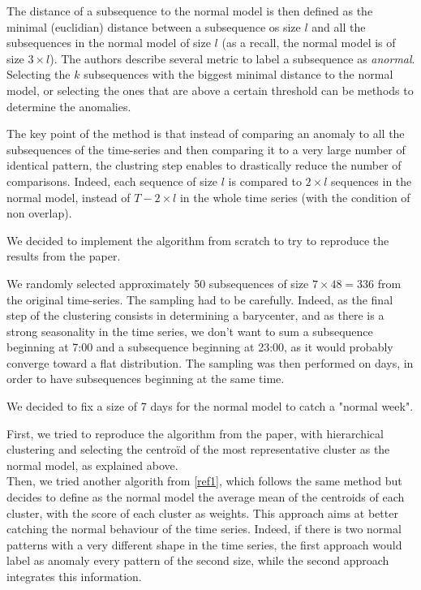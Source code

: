 \documentclass[11pt]{article}
\begin{document}
The distance of a subsequence to the normal model is then defined as the minimal (euclidian) distance between a subsequence os size $l$ and all the subsequences in the normal model of size $l$ (as a recall, the normal model is of size $3 \times l$).
The authors describe several metric to label a subsequence as \textit{anormal}. 
Selecting the $k$ subsequences with the biggest minimal distance to the normal model, or selecting the ones that are above a certain threshold can be methods to determine the anomalies.

The key point of the method is that instead of comparing an anomaly to all the subsequences of the time-series and then comparing it to a very large number of identical pattern, the clustring step enables to drastically reduce the number of comparisons. 
Indeed, each sequence of size $l$ is compared to $2 \times l $ sequences in the normal model, instead of $T - 2 \times l$ in the whole time series (with the condition of non overlap). 


We decided to implement the algorithm from scratch to try to reproduce the results from the paper. 

We randomly selected approximately 50 subsequences of size $ 7 \times 48 = 336$ from the original time-series. 
The sampling had to be carefully. 
Indeed, as the final step of the clustering consists in determining a barycenter, and as there is a strong seasonality in the time series, we don't want to sum a subsequence beginning at 7:00 and a subsequence beginning at 23:00, as it would probably converge toward a flat distribution. 
The sampling was then performed on days, in order to have subsequences beginning at the same time. 

We decided to fix a size of 7 days for the normal model to catch a "normal week". 

First, we tried to reproduce the algorithm from the paper, with hierarchical clustering and selecting the centroïd of the most representative cluster as the normal model, as explained above.\\

Then, we tried another algorith from \ref{ref1}, which follows the same method but decides to define as the normal model the average mean of the centroids of each cluster, with the score of each cluster as weights. 
This approach aims at better catching the normal behaviour of the time series. 
Indeed, if there is two normal patterns with a very different shape in the time series, the first approach would label as anomaly every pattern of the second size, while the second approach integrates this information. \\
\end{document}
